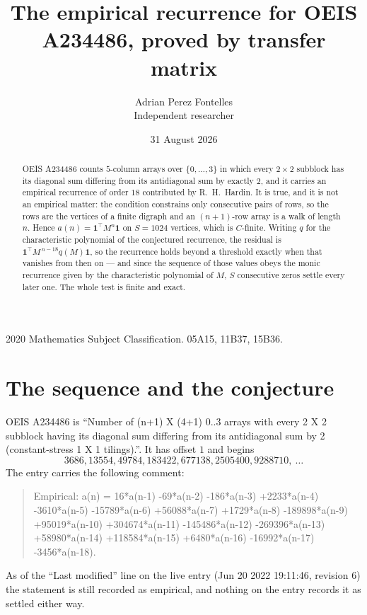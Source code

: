\documentclass[11pt,a4paper]{article}
\title{The empirical recurrence for OEIS A234486, proved by transfer matrix}
\author{Adrian Perez Fontelles\\ \small Independent researcher}
\date{31 August 2026}
\theoremstyle{plain}
\theoremstyle{definition}
\begin{document}
\maketitle

\begin{abstract}
OEIS A234486 counts $5$-column arrays over $\{0,\dots,3\}$ in which every
$2\times2$ subblock has its diagonal sum differing from its antidiagonal sum by
exactly $2$, and it
carries an empirical recurrence of order $18$ contributed by R.~H.~Hardin. It is true,
and it is not an empirical matter: the condition constrains only consecutive pairs of rows,
so the rows are the vertices of a finite digraph and an $(n+1)$-row array is a walk of
length $n$. Hence $a(n)=\mathbf{1}^{\!\top}M^{n}\mathbf{1}$ on $S=1024$ vertices, which
is $C$-finite. Writing $q$ for the characteristic polynomial of the conjectured recurrence,
the residual is $\mathbf{1}^{\!\top}M^{\,n-18}q(M)\mathbf{1}$, so the recurrence
holds beyond a threshold exactly when that vanishes from then on --- and since the sequence
of those values obeys the monic recurrence given by the characteristic polynomial of $M$,
$S$ consecutive zeros settle every later one. The whole test is finite and exact.
\end{abstract}

\noindent\small 2020 Mathematics Subject Classification. 05A15, 11B37, 15B36.\normalsize

\section{The sequence and the conjecture}

OEIS A234486 is ``Number of (n+1) X (4+1) 0..3 arrays with every 2 X 2 subblock having its diagonal sum differing from its antidiagonal sum by 2 (constant-stress 1 X 1 tilings).''. It has offset
$1$ and begins
\[
3686, 13554, 49784, 183422, 677138, 2505400, 9288710,\ \dots
\]
The entry carries the following comment:
\begin{quote}\small
Empirical: a(n) = 16*a(n-1) -69*a(n-2) -186*a(n-3) +2233*a(n-4) -3610*a(n-5) -15789*a(n-6) +56088*a(n-7) +1729*a(n-8) -189898*a(n-9) +95019*a(n-10) +304674*a(n-11) -145486*a(n-12) -269396*a(n-13) +58980*a(n-14) +118584*a(n-15) +6480*a(n-16) -16992*a(n-17) -3456*a(n-18).
\end{quote}
As of the ``Last modified'' line on the live entry (Jun 20 2022 19:11:46, revision 6) the statement is
still recorded as empirical, and nothing on the entry records it as settled either way.
\end{document}
